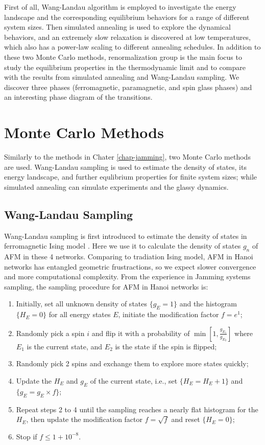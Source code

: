 First of all,  Wang-Landau algorithm is employed to investigate the energy landscape and the corresponding equilibrium behaviors for a range of different system sizes. Then simulated annealing is used to explore the dynamical behaviors, and an extremely slow relaxation is discovered at low temperatures, which also has a power-law scaling to different annealing schedules.  In addition to these two Monte Carlo methods, renormalization group is the main focus to study the equilibrium properties in the thermodynamic limit and to compare with the results from simulated annealing and Wang-Landau sampling. We discover three phases (ferromagnetic, paramagnetic, and spin glass phases) and an interesting phase diagram of the transitions. 


\section{Monte Carlo Methods}
\label{sec:afm-mc}
Similarly to the methods in Chater \ref{chap-jamming}, two Monte Carlo methods are used. Wang-Landau sampling is used to estimate the density of states, its energy landscape, and further equlibrium properties for finite system sizes; while simulated annealing can simulate experiments and the glassy dynamics.
 
\subsection{Wang-Landau Sampling}
Wang-Landau sampling is first introduced to estimate the density of states in ferromagnetic Ising model \cite{Wang2001}. Here we use it to calculate the density of states $g_{n}$ of AFM in
these 4 networks. Comparing to tradiation Ising model, AFM in Hanoi networks has entangled geometric frustractions, so we expect slower convergence and more computational complexity. From the experience in Jamming systems sampling, the sampling procedure for AFM in Hanoi networks is: 
\begin{enumerate}
\item Initially, set all unknown density of states $\{g_{E}=1\}$ and the
histogram $\{H_{E}=0\}$ for all energy states $E$, initiate the modification
factor $f=e^1$; 
\item Randomly pick a spin $i$ and flip it with a probability of $\min\left[1,\frac{g_{E_1}}{g_{E_2}}\right]$ where $E_1$ is the current state, and $E_2$ is the state if the spin is flipped;
\item Randomly pick 2 spins and exchange them to explore more states quickly; 
\item Update the $H_{E}$ and $g_{E}$ of the current state, i.e., set $\{H_{E}=H_{E}+1\}$
and $\{g_{E}=g_{E}\times f\}$; 
\item Repeat steps 2 to 4 until the sampling reaches a nearly flat histogram
for the $H_{E}$, then update the modification factor $f=\sqrt{f}$
and reset $\{H_{E}=0\}$; 
\item Stop if $f\le1+10^{-8}$. 
\end{enumerate}

